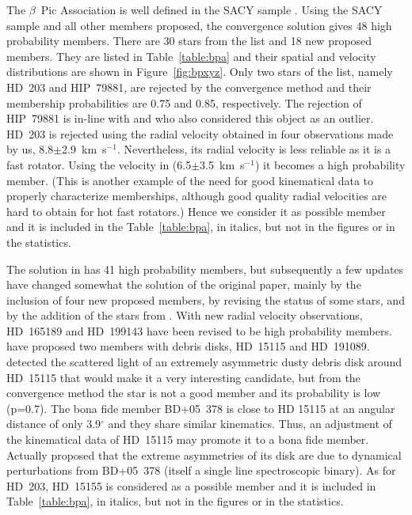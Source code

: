 \documentclass[11pt,twoside]{book}
\begin{document}
The $\beta$~Pic Association is well defined in the SACY sample \citep{torres06}.
Using the SACY sample and all other members proposed, the convergence solution
gives 48 high probability members.
There are 30 stars from the \citet{zuckerman04} list
and 18 new proposed members. They are listed in  Table~\ref{table:bpa} and
their spatial and velocity distributions are shown in Figure~\ref{fig:bpxyz}.
Only two stars of the \citet{zuckerman04} list, namely HD~203 and HIP~79881,  are
rejected by the convergence
method and their membership probabilities are 0.75 and 0.85, respectively.
The rejection of HIP~79881 is in-line with \cite{song03} and \cite{ortega04} who
also considered this object as an outlier.
HD~203 is rejected using the radial velocity obtained in four observations made by us,
8.8$\pm$2.9~km~s$^{-1}$.
Nevertheless, its radial velocity is  less reliable as it is a fast rotator.
Using the velocity in \citet{barbier00} (6.5$\pm$3.5~km~s$^{-1}$)  it
becomes a high probability member.
(This is another example of the need for good kinematical data to properly
characterize  memberships, although good quality radial velocities are hard to obtain for hot fast rotators.)
Hence we consider it as possible member and it is included in the
Table~\ref{table:bpa}, in italics,
but not in the figures or in the statistics.

The solution in \citet{torres06} has 41 high probability members, but
subsequently a few updates have changed somewhat the solution of the
original paper, mainly by the inclusion of four new proposed members,
by revising the status of some stars, and by the addition of the stars
from \citet{moor06}.  With new radial velocity observations, HD~165189
and HD~199143 have been revised to be high probability members.
\citet{moor06} have proposed two members with debris disks, HD~15115
and HD~191089.  \citet{kalas07} detected the scattered light of an
extremely asymmetric dusty debris disk around HD~15115 that would make
it a very interesting candidate, but from the convergence method the
star is not a good member and its probability is low (p=0.7).  The
bona fide member BD+05~378 is close to HD 15115
at an angular distance of only 3.9$^\circ$
 and they share similar kinematics.  Thus, an adjustment of the
kinematical data of HD~15115 may promote it to a bona fide member.
Actually \citet{kalas07} proposed that the extreme asymmetries of its
disk are due to dynamical perturbations from BD+05~378 (itself a
single line spectroscopic binary).  As for HD~203, HD~15155 is
considered as a possible member and it is included in
Table~\ref{table:bpa}, in italics, but not in the figures or in the
statistics.
\end{document}
